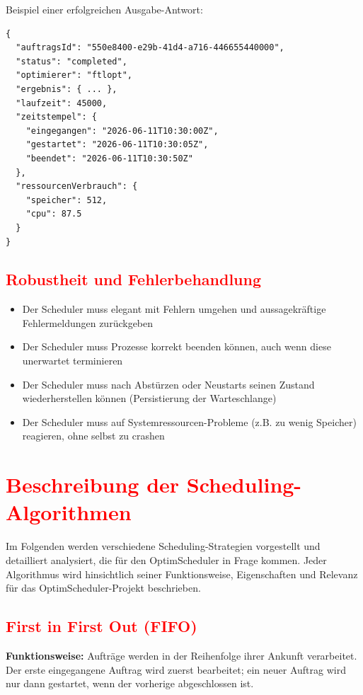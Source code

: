 Beispiel einer erfolgreichen Ausgabe-Antwort:
\begin{verbatim}
{
  "auftragsId": "550e8400-e29b-41d4-a716-446655440000",
  "status": "completed",
  "optimierer": "ftlopt",
  "ergebnis": { ... },
  "laufzeit": 45000,
  "zeitstempel": {
    "eingegangen": "2026-06-11T10:30:00Z",
    "gestartet": "2026-06-11T10:30:05Z",
    "beendet": "2026-06-11T10:30:50Z"
  },
  "ressourcenVerbrauch": {
    "speicher": 512,
    "cpu": 87.5
  }
}
\end{verbatim}

\subsection{\textcolor{red}{Robustheit und Fehlerbehandlung}}

\begin{itemize}
    \item Der Scheduler muss elegant mit Fehlern umgehen und aussagekräftige Fehlermeldungen zurückgeben
    \item Der Scheduler muss Prozesse korrekt beenden können, auch wenn diese unerwartet terminieren
    \item Der Scheduler muss nach Abstürzen oder Neustarts seinen Zustand wiederherstellen können (Persistierung der Warteschlange)
    \item Der Scheduler muss auf Systemressourcen-Probleme (z.B. zu wenig Speicher) reagieren, ohne selbst zu crashen
\end{itemize}

\section{\textcolor{red}{Beschreibung der Scheduling-Algorithmen}}

Im Folgenden werden verschiedene Scheduling-Strategien vorgestellt und detailliert analysiert, die für den OptimScheduler in Frage kommen. Jeder Algorithmus wird hinsichtlich seiner Funktionsweise, Eigenschaften und Relevanz für das OptimScheduler-Projekt beschrieben.

\subsection{\textcolor{red}{First in First Out (FIFO)}}

\textbf{Funktionsweise:} Aufträge werden in der Reihenfolge ihrer Ankunft verarbeitet. Der erste eingegangene Auftrag wird zuerst bearbeitet; ein neuer Auftrag wird nur dann gestartet, wenn der vorherige abgeschlossen ist.


